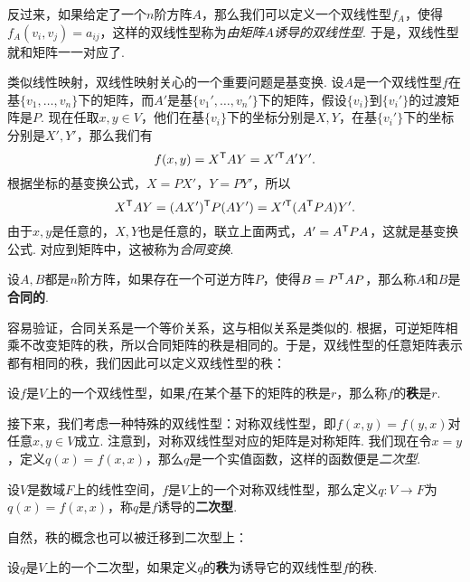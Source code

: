 反过来，如果给定了一个$n$阶方阵$A$，那么我们可以定义一个双线性型$f_A$，使得$f_A(v_i,v_j)=a_{ij}$，这样的双线性型称为\emph{由矩阵$A$诱导的双线性型}. 于是，双线性型就和矩阵一一对应了. 

类似线性映射，双线性映射关心的一个重要问题是基变换. 设$A$是一个双线性型$f$在基$\{v_1,\dots,v_n\}$下的矩阵，而$A'$是基$\{v_1',\dots,v_n'\}$下的矩阵，假设$\{v_i\}$到$\{v_i'\}$的过渡矩阵是$P$. 现在任取$x,y\in V$，他们在基$\{v_i\}$下的坐标分别是$X,Y$，在基$\{v_i'\}$下的坐标分别是$X',Y'$，那么我们有
\[
    f(x,y)=X^{\mathsf{T}} AY=X'^{\mathsf{T}} A'Y'.
\]
根据坐标的基变换公式，$X=PX'$，$Y=PY'$，所以
\[
    X^{\mathsf{T}} AY=(AX')^{\mathsf{T}} P(AY')=X'^{\mathsf{T}} (A^{\mathsf{T}} P A)Y'.
\]
由于$x,y$是任意的，$X,Y$也是任意的，联立上面两式，$A'=A^{\mathsf{T}} P A$，这就是基变换公式. 对应到矩阵中，这被称为\emph{合同变换}. 

\begin{definition}[合同矩阵]\label{def:congruent-matrix}
    设$A,B$都是$n$阶方阵，如果存在一个可逆方阵$P$，使得$B=P^{\mathsf{T}} A P$，那么称$A$和$B$是\textbf{合同的}. 
\end{definition}

容易验证，合同关系是一个等价关系，这与相似关系是类似的. 根据，可逆矩阵相乘不改变矩阵的秩，所以合同矩阵的秩是相同的。于是，双线性型的任意矩阵表示都有相同的秩，我们因此可以定义双线性型的秩：

\begin{definition}[双线性型的秩]\label{def:bilinear-form-rank}
    设$f$是$V$上的一个双线性型，如果$f$在某个基下的矩阵的秩是$r$，那么称$f$的\textbf{秩}是$r$.
\end{definition}

接下来，我们考虑一种特殊的双线性型：对称双线性型，即$f(x,y)=f(y,x)$对任意$x,y\in V$成立. 注意到，对称双线性型对应的矩阵是对称矩阵. 我们现在令$x=y$，定义$q(x)=f(x,x)$，那么$q$是一个实值函数，这样的函数便是\emph{二次型}. 

\begin{definition}[二次型]\label{def:quadratic-form}
    设$V$是数域$F$上的线性空间，$f$是$V$上的一个对称双线性型，那么定义$q:V\to F$为$q(x)=f(x,x)$，称$q$是$f$诱导的\textbf{二次型}. 
\end{definition}

自然，秩的概念也可以被迁移到二次型上：
\begin{definition}[二次型的秩]\label{def:quadratic-form-rank}
设$q$是$V$上的一个二次型，如果定义$q$的\textbf{秩}为诱导它的双线性型$f$的秩. 
\end{definition}

